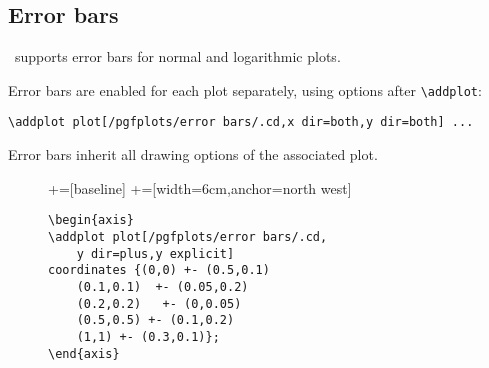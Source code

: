 \subsection{Error bars}
\label{sec:errorbars}
{%
\def\pgfplotserror#1{\ensuremath{\epsilon_{#1}}}%
\PGFPlots\ supports error bars for normal and logarithmic plots. 

Error bars are enabled for each plot separately, using options after \lstinline!\addplot!:
\begin{lstlisting}
\addplot plot[/pgfplots/error bars/.cd,x dir=both,y dir=both] ...
\end{lstlisting}
Error bars inherit all drawing options of the associated plot.

\begin{figure}
	\centering
	+=[baseline]%
	+=[width=6cm,anchor=north west]%
	\lstset{basicstyle=\ttfamily\footnotesize,aboveskip=0pt,belowskip=0pt}%
	\nobreak
	\hspace{10pt}%
	\nobreak
	\begin{minipage}[t]{8cm}%
	\vspace{0pt}%
\begin{lstlisting}
\begin{axis}
\addplot plot[/pgfplots/error bars/.cd,
	y dir=plus,y explicit]
coordinates {(0,0) +- (0.5,0.1) 
	(0.1,0.1)  +- (0.05,0.2)
	(0.2,0.2) 	+- (0,0.05)
	(0.5,0.5) +- (0.1,0.2)
	(1,1) +- (0.3,0.1)};
\end{axis}
\end{lstlisting}
	\end{minipage}%


\end{figure}}
